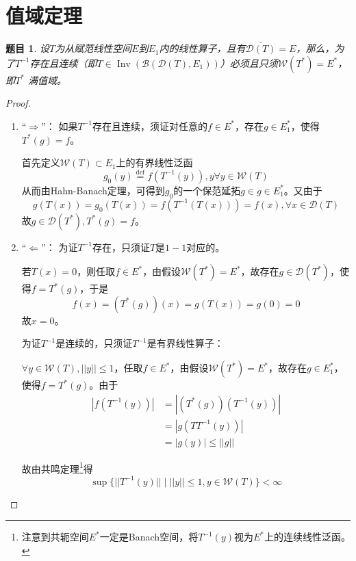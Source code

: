 \documentclass[winfonts,UTF8,c5size,a4paper,fancyhdr,hyperref,titlepage,nocap]{ctexart}
\theoremstyle{question}
\newtheorem{Qut}{题目}
\theoremstyle{theorem}
\theoremstyle{definition}
\theoremstyle{remark}
\numberwithin{equation}{subsection}
\newcommand{\defeq}{\stackrel{{\mathrm{def}}}{=}}
\newcommand{\Inv}{\operatorname{Inv}}
\begin{document}
\section{值域定理}
\begin{Qut}
设$T$为从赋范线性空间$E$到$E_1$内的线性算子，且有$\overline{\mathcal{D}(T)}=E$，那么，为了$T^{-1}$存在且连续（即$T\in\Inv(\mathcal{B}(\mathcal{D}(T),E_1))$）必须且只须$\mathcal{W}(T^{\ast})=E^{\ast}$，即$T^{\ast}$ 满值域。
\end{Qut}
\begin{proof}
\begin{enumerate}[1)]
    \setlength{\itemindent}{2ex}
    \item ``$\Longrightarrow$''：
    如果$T^{-1}$存在且连续，须证对任意的$f\in E^{\ast}$，存在$g\in E_1^{\ast}$，使得$T^{\ast}(g)=f$。

  首先定义$\mathcal{W}(T)\subset E_1$上的有界线性泛函
  \begin{equation*}
  g_0(y)\defeq f(T^{-1}(y)), y\forall y\in\mathcal{W}(T)
  \end{equation*}
  从而由Hahn-Banach定理，可得到$g_0$的一个保范延拓$g\in g\in E_1^{\ast}$。又由于
  \begin{equation*}
  g(T(x))=g_0(T(x))=f(T^{-1}(T(x)))=f(x), \forall x\in \mathcal{D}(T)
  \end{equation*}
  故$g\in\mathcal{D}(T^{\ast}),T^{\ast}(g)=f$。
  \item ``$\Longleftarrow$''：
  为证$T^{-1}$存在，只须证$T$是$1-1$对应的。

若$T(x)=0$，则任取$f\in E^{\ast}$，由假设$\mathcal{W}(T^{\ast})=E^{\ast}$，故存在$g\in\mathcal{D}(T^{\ast})$，使得$f=T^{\ast}(g)$，于是
\begin{equation*}
f(x)=(T^{\ast}(g))(x)=g(T(x))=g(0)=0
\end{equation*}
故$x=0$。

为证$T^{-1}$是连续的，只须证$T^{-1}$是有界线性算子：

$\forall y\in\mathcal{W}(T), ||y||\leqslant1$，任取$f\in E^{\ast}$，由假设$\mathcal{W}(T^{\ast})=E^{\ast}$，故存在$g\in E_1^{\ast}$，使得$f=T^{\ast}(g)$。由于
\begin{align*}
|f(T^{-1}(y))|&=|(T^{\ast}(g))(T^{-1}(y))|\\
              &=|g(TT^{-1}(y))|\\
              &=|g(y)|\leqslant||g||
\end{align*}

故由共鸣定理\footnote{注意到共轭空间$E^{\ast}$一定是Banach空间，将$T^{-1}(y)$视为$E^{\ast}$上的连续线性泛函。}得
\begin{equation*}
\sup\{||T^{-1}(y)||\mid||y||\leqslant1, y\in\mathcal{W}(T)\}<\infty
\end{equation*}
\end{enumerate}
\end{proof}
\end{document}
